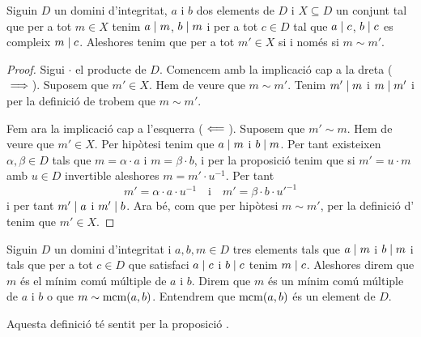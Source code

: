 \documentclass[../Apunts.tex]{subfiles}
\begin{document}
	\begin{proposition}
		\label{prop:mínim comú múltiple anells}
		Siguin \(D\) un domini d'integritat, \(a\) i \(b\) dos elements de \(D\) i \(X\subseteq D\) un conjunt tal que per a tot \(m\in X\) tenim \(a\mathrel{|} m\), \(b\mathrel{|} m\) i per a tot \(c\in D\) tal que \(a\mathrel{|} c\), \(b\mathrel{|} c\) es compleix \(m\mathrel{|} c\). Aleshores tenim que per a tot \(m'\in X\) si i només si \(m\sim m'\).
		\begin{proof}
			Sigui \(\cdot\) el producte de \(D\). Comencem amb la implicació cap a la dreta (\(\implies\)). Suposem que \(m'\in X\). Hem de veure que \(m\sim m'\). Tenim \(m'\mathrel{|} m\) i \(m\mathrel{|} m'\) i per la definició de  trobem que \(m\sim m'\). %
			
			Fem ara la implicació cap a l'esquerra (\(\impliedby\)). Suposem que \(m'\sim m\). Hem de veure que \(m'\in X\). Per hipòtesi tenim que \(a\mathrel{|} m\) i \(b\mathrel{|} m\). Per tant existeixen \(\alpha,\beta\in D\) tals que \(m=\alpha\cdot a\) i \(m=\beta\cdot b\), i per la proposició  tenim que si \(m'=u\cdot m\) amb \(u\in D\) invertible aleshores \(m=m'\cdot u^{-1}\). Per tant
			\[m'=\alpha\cdot a\cdot u^{-1}\quad\text{i}\quad m'=\beta\cdot b\cdot{u'}^{-1}\]
			i per tant \(m'\mathrel{|} a\) i \(m'\mathrel{|} b\). Ara bé, com que per hipòtesi \(m\sim m'\), per la definició d' tenim que \(m'\in X\). %
		\end{proof}
	\end{proposition}
	\begin{definition}
		\label{def:mínim comú múltiple anells}
		\label{def:mcm anells}
		Siguin \(D\) un domini d'integritat i \(a,b,m\in D\) tres elements tals que \(a\mathrel{|} m\) i \(b\mathrel{|} m\) i tals que per a tot \(c\in D\) que satisfaci \(a\mathrel{|} c\) i \(b\mathrel{|} c\) tenim \(m\mathrel{|} c\). Aleshores direm que \(m\) és el mínim comú múltiple de \(a\) i \(b\). Direm que \(m\) és un mínim comú múltiple de \(a\) i \(b\) o que \(m\sim\operatorname{mcm}(a,b)\).
		Entendrem que \(\operatorname{mcm}(a,b)\) és un element de \(D\).
		
		Aquesta definició té sentit per la proposició .
	\end{definition}
\end{document}
